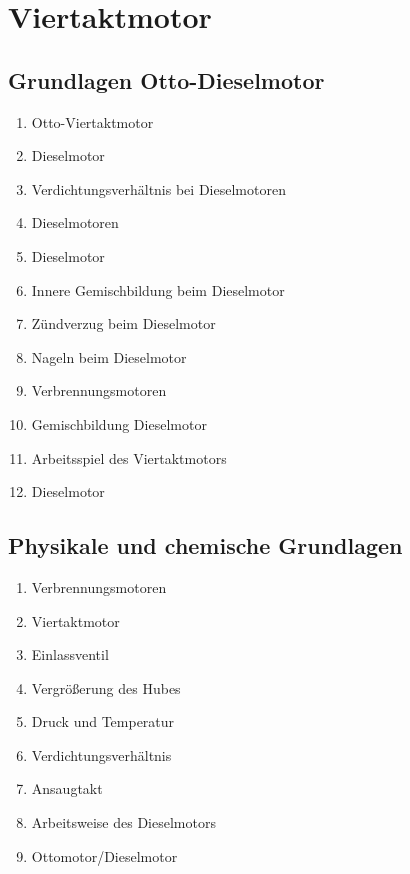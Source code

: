 \section{Viertaktmotor}\label{viertaktmotor}

\subsection{Grundlagen
Otto-Dieselmotor}\label{grundlagen-otto-dieselmotor}

\begin{enumerate}
\item
  Otto-Viertaktmotor\\
\item
  Dieselmotor\\
\item
  Verdichtungsverhältnis bei Dieselmotoren\\
\item
  Dieselmotoren\\
\item
  Dieselmotor\\
\item
  Innere Gemischbildung beim Dieselmotor\\
\item
  Zündverzug beim Dieselmotor\\
\item
  Nageln beim Dieselmotor\\
\item
  Verbrennungsmotoren\\
\item
  Gemischbildung Dieselmotor\\
\item
  Arbeitsspiel des Viertaktmotors\\
\item
  Dieselmotor
\end{enumerate}

\subsection{Physikale und chemische
Grundlagen}\label{physikale-und-chemische-grundlagen}

\begin{enumerate}
\item
  Verbrennungsmotoren\\
\item
  Viertaktmotor\\
\item
  Einlassventil\\
\item
  Vergrößerung des Hubes\\
\item
  Druck und Temperatur\\
\item
  Verdichtungsverhältnis\\
\item
  Ansaugtakt\\
\item
  Arbeitsweise des Dieselmotors\\
\item
  Ottomotor/Dieselmotor
\end{enumerate}

